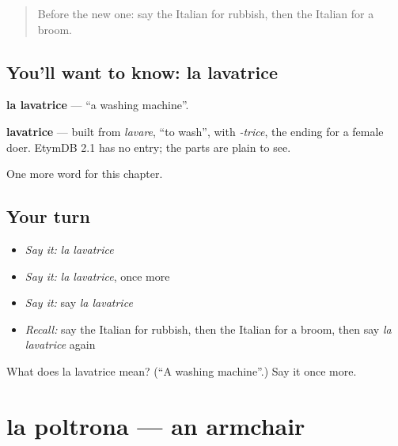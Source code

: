 \label{lesson:IT-C97-lavatrice}



\begin{quote}
Before the new one: say the Italian for rubbish, then the Italian for a broom.
\end{quote}

\subsection*{You'll want to know: la lavatrice}
\textbf{la lavatrice} — \textquotedblleft{}a washing machine\textquotedblright{}.

\begin{cousinweb}
\textbf{lavatrice} — built from \emph{lavare}, \textquotedblleft{}to wash\textquotedblright{}, with \emph{-trice}, the ending for a female doer. EtymDB 2.1 has no entry; the parts are plain to see.
\end{cousinweb}

\begin{grammarlens}[title={What you've built}]
One more word for this chapter.
\end{grammarlens}

\subsection*{Your turn}
\begin{itemize}
\raggedright
  \item \emph{Say it:} \emph{la lavatrice}
  \item \emph{Say it:} \emph{la lavatrice}, once more
  \item \emph{Say it:} say \emph{la lavatrice}
  \item \emph{Recall:} say the Italian for rubbish, then the Italian for a broom, then say \emph{la lavatrice} again
\end{itemize}

\begin{tcolorbox}[breakable,colback=teal!4,colframe=teal!35!black,title={Before you move on}]
What does la lavatrice mean? (\textquotedblleft{}A washing machine\textquotedblright{}.) Say it once more.
\end{tcolorbox}
\section[la poltrona]{la poltrona — an armchair}

\label{lesson:IT-C97-poltrona}



